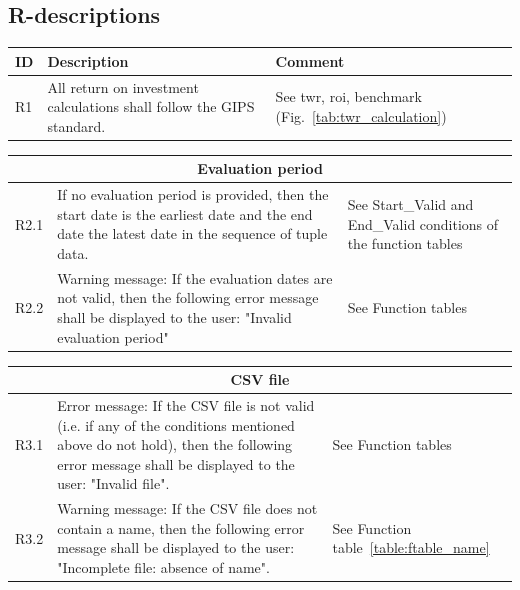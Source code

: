 \documentclass[runningheads,12pt]{article}
\begin{document}
\subsection{R-descriptions}

{\centering
\begin{longtable}{|l|p{9cm}|p{5cm}|}
\hline
\textbf{ID} & \textbf{Description} & \textbf{Comment}\\

\hline
R1 & All return on investment calculations shall follow the GIPS standard. & See twr, roi, benchmark (Fig.~\ref{tab:twr_calculation}) \\

\hline
\end{longtable}
\centering
\begin{longtable}{|l|p{9cm}|p{5cm}|}
\hline
\multicolumn{3}{|c|}{\textbf{Evaluation period}} \\

\hline
R2.1 & If no evaluation period is provided, then the start date is the earliest date and the end date the latest date in the sequence of tuple data. & See Start\_Valid and End\_Valid conditions of the function tables\\

\hline
R2.2 &  Warning message: If the evaluation dates are not valid, then the following error message shall be displayed to the user: "Invalid evaluation period" & See Function tables \\

\hline
\end{longtable}
\centering
\begin{longtable}{|l|p{9cm}|p{5cm}|}

\hline
\multicolumn{3}{|c|}{\textbf{CSV file}} \\

\hline
R3.1 &  Error message: If the CSV file is not valid (i.e. if any of the conditions mentioned above do not hold), then the following error message shall be displayed to the user: "Invalid file". & See Function tables\\

\hline
R3.2 &  Warning message: If the CSV file does not contain a name, then the following error message shall be displayed to the user: "Incomplete file: absence of name". & See Function table~\ref{table:ftable_name}\\

\hline
\end{longtable}
\centering
\begin{longtable}{|l|p{9cm}|p{5cm}|}


\end{longtable}}
\end{document}
